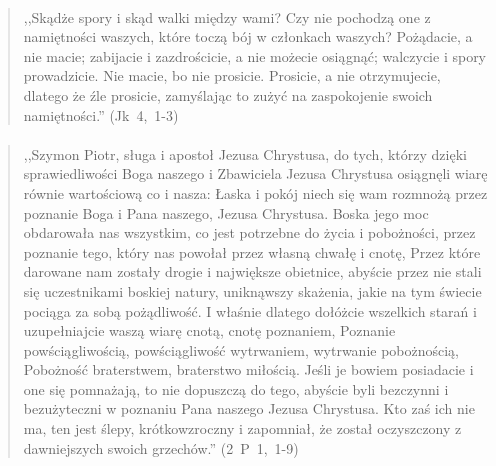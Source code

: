 \documentclass[10pt,a4paper,oneside]{article}
\begin{document}
\paragraph{}
\begin{quote}
,,Skądże spory i skąd walki między wami? Czy nie pochodzą one z namiętności waszych, które toczą bój w członkach waszych? Pożądacie, a nie macie; zabijacie i zazdrościcie, a nie możecie osiągnąć; walczycie i spory prowadzicie. Nie macie, bo nie prosicie. Prosicie, a nie otrzymujecie, dlatego że źle prosicie, zamyślając to zużyć na zaspokojenie swoich namiętności.'' \mbox{(Jk 4, 1-3)}
\end{quote}
\paragraph{}
\begin{quote}
,,Szymon Piotr, sługa i apostoł Jezusa Chrystusa, do tych, którzy dzięki sprawiedliwości Boga naszego i Zbawiciela Jezusa Chrystusa osiągnęli wiarę równie wartościową co i nasza: Łaska i pokój niech się wam rozmnożą przez poznanie Boga i Pana naszego, Jezusa Chrystusa. Boska jego moc obdarowała nas wszystkim, co jest potrzebne do życia i pobożności, przez poznanie tego, który nas powołał przez własną chwałę i cnotę, Przez które darowane nam zostały drogie i największe obietnice, abyście przez nie stali się uczestnikami boskiej natury, uniknąwszy skażenia, jakie na tym świecie pociąga za sobą pożądliwość. I właśnie dlatego dołóżcie wszelkich starań i uzupełniajcie waszą wiarę cnotą, cnotę poznaniem, Poznanie powściągliwością, powściągliwość wytrwaniem, wytrwanie pobożnością, Pobożność braterstwem, braterstwo miłością. Jeśli je bowiem posiadacie i one się pomnażają, to nie dopuszczą do tego, abyście byli bezczynni i bezużyteczni w poznaniu Pana naszego Jezusa Chrystusa. Kto zaś ich nie ma, ten jest ślepy, krótkowzroczny i zapomniał, że został oczyszczony z dawniejszych swoich grzechów.'' \mbox{(2 P 1, 1-9)}
\end{quote}
\end{document}
